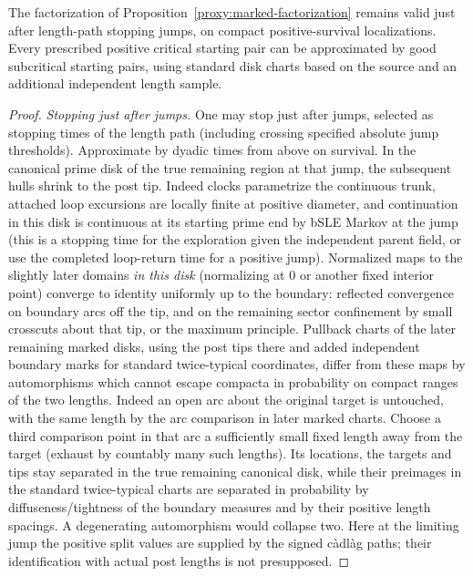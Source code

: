 \begin{lemma}\label{proxy:jump-times}
The factorization of Proposition~\ref{proxy:marked-factorization} remains valid just after length-path stopping jumps, on compact positive-survival localizations.  Every prescribed positive critical starting pair can be approximated by good subcritical starting pairs, using standard disk charts based on the source and an additional independent length sample.
\end{lemma}\begin{proof}

\smallskip\noindent\textit{Stopping just after jumps.}\quad
One may stop just after jumps, selected as stopping times of the length path (including crossing specified absolute jump thresholds).
Approximate by dyadic times from above on survival.
In the canonical prime disk of the true remaining region at that jump, the subsequent hulls shrink to the post tip.
Indeed clocks parametrize the continuous trunk, attached loop excursions are locally finite at positive diameter, and continuation in this disk is continuous at its starting prime end by bSLE Markov at the jump (this is a stopping time for the exploration given the independent parent field, or use the completed loop-return time for a positive jump).
Normalized maps to the slightly later domains \emph{in this disk} (normalizing at 0 or another fixed interior point) converge to identity uniformly up to the boundary: reflected convergence on boundary arcs off the tip, and on the remaining sector confinement by small crosscuts about that tip, or the maximum principle.
Pullback charts of the later remaining marked disks, using the post tips there and added independent boundary marks for standard twice-typical coordinates, differ from these maps by automorphisms which cannot escape compacta in probability on compact ranges of the two lengths.
Indeed an open arc about the original target is untouched, with the same length by the arc comparison in later marked charts.
Choose a third comparison point in that arc a sufficiently small fixed length away from the target (exhaust by countably many such lengths).
Its locations, the targets and tips stay separated in the true remaining canonical disk, while their preimages in the standard twice-typical charts are separated in probability by diffuseness/tightness of the boundary measures and by their positive length spacings. A degenerating automorphism would collapse two.
Here at the limiting jump the positive split values are supplied by the signed càdlàg paths; their identification with actual post lengths is not presupposed.

\end{proof}
